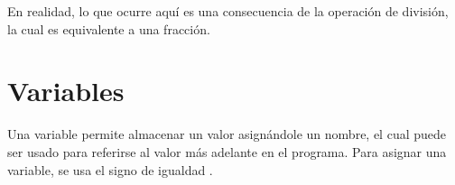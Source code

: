 
En realidad, lo que ocurre aquí es una consecuencia de la operación de división, la cual es equivalente a una fracción.

\section{Variables}

Una variable permite almacenar un valor asignándole un nombre, el cual puede ser usado para referirse al valor más adelante en el programa.
Para asignar una variable, se usa el signo de igualdad \ttt{=}.


\clearpage
